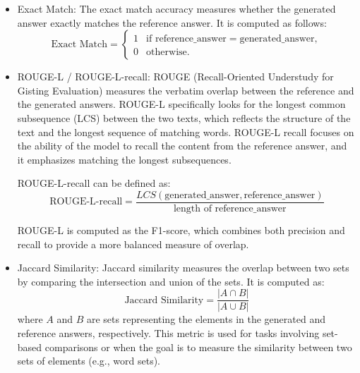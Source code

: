 \begin{itemize} \item Exact Match: The exact match accuracy measures whether the generated answer exactly matches the reference answer. It is computed as follows: 
\[
\text{Exact Match} = 
\begin{cases} 
1 & \text{if } \text{reference\_answer} = \text{generated\_answer}, \\
0 & \text{otherwise}.
\end{cases}
\]
\item ROUGE-L / ROUGE-L-recall: ROUGE (Recall-Oriented Understudy for Gisting Evaluation) \cite{lin-2004-rouge} measures the verbatim overlap between the reference and the generated answers. ROUGE-L specifically looks for the longest common subsequence (LCS) between the two texts, which reflects the structure of the text and the longest sequence of matching words. ROUGE-L recall focuses on the ability of the model to recall the content from the reference answer, and it emphasizes matching the longest subsequences.

ROUGE-L-recall can be defined as:
\[
\text{ROUGE-L-recall} = \frac{LCS(\text{generated\_answer}, \text{reference\_answer})}{\text{length of reference\_answer}}
\]

ROUGE-L is computed as the F1-score, which combines both precision and recall to provide a more balanced measure of overlap.

\item Jaccard Similarity: Jaccard similarity measures the overlap between two sets by comparing the intersection and union of the sets. It is computed as:
\[
\text{Jaccard Similarity} = \frac{|A \cap B|}{|A \cup B|}
\]
where \(A\) and \(B\) are sets representing the elements in the generated and reference answers, respectively. This metric is used for tasks involving set-based comparisons or when the goal is to measure the similarity between two sets of elements (e.g., word sets).
\end{itemize}
